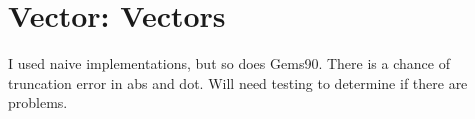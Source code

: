 \section{Vector: Vectors}
I used naive implementations, but so does Gems90.  There is a chance of
truncation error in abs and dot.   Will need testing to determine if there
are problems.
